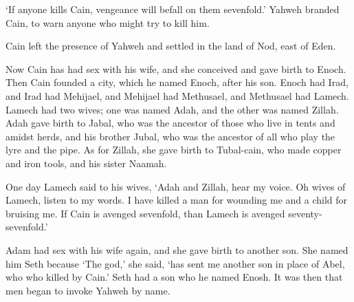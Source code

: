 `If anyone kills Cain, vengeance will befall on them sevenfold.'
Yahweh branded Cain, to warn anyone who might try to kill him.

Cain left the presence of Yahweh
and settled in the land of Nod, east of Eden.

\secsep

\noindent Now Cain has had sex with his wife,
and she conceived and gave birth to Enoch.
Then Cain founded a city, 
which he named Enoch,
after his son.
Enoch had Irad, 
and Irad had Mehijael,
and Mehijael had Methusael,
and Methusael had Lamech.
Lamech had two wives; 
one was named Adah,
and the other was named Zillah.
Adah gave birth to Jabal,
who was the ancestor of those 
who live in tents and amidst herds,
and his brother Jubal, 
who was the ancestor of 
all who play the lyre and the pipe.
As for Zillah, 
she gave birth to Tubal-cain,
who made copper and iron tools,
and his sister Naamah.

One day Lamech said to his wives,
`Adah and Zillah, hear my voice.
Oh wives of Lamech, listen to my words.
I have killed a man for wounding me
and a child for bruising me.
If Cain is avenged sevenfold,
than Lamech is avenged seventy-sevenfold.'

Adam had sex with his wife again, 
and she gave birth to another son.
She named him Seth because `The god,' she said,
`has sent me another son in place of Abel,
who who killed by Cain.'
Seth had a son who he named Enosh.
It was then that men began to invoke Yahweh by name.